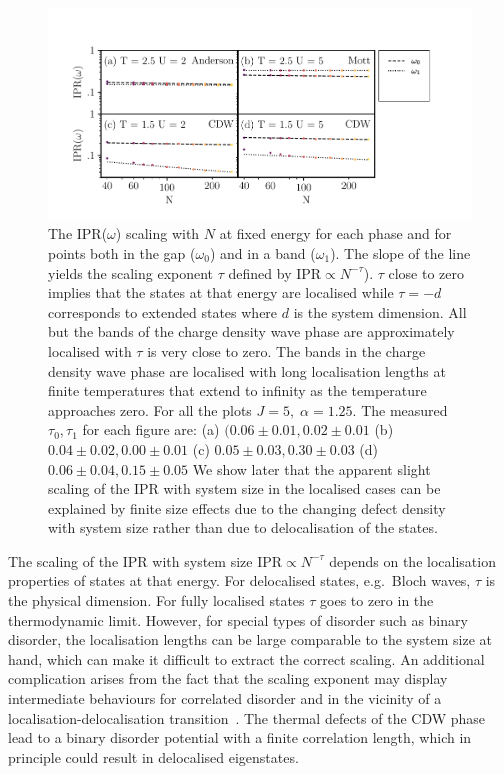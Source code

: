 \hypertarget{fig:IPR_scaling}{%
\begin{figure}
\centering
\includegraphics[width=1\textwidth,height=\textheight]{figure_code/fk_chapter/DOS/IPR_scaling}
\caption[{Scaling of IPR(\(\omega\)) against system size \(N\).}]{The IPR(\(\omega\)) scaling with \(N\) at fixed energy for each phase and for points both in the gap (\(\omega_0\)) and in a band (\(\omega_1\)). The slope of the line yields the scaling exponent \(\tau\) defined by \(\mathrm{IPR} \propto N^{-\tau}\)). \(\tau\) close to zero implies that the states at that energy are localised while \(\tau = -d\) corresponds to extended states where \(d\) is the system dimension. All but the bands of the charge density wave phase are approximately localised with \(\tau\) is very close to zero. The bands in the charge density wave phase are localised with long localisation lengths at finite temperatures that extend to infinity as the temperature approaches zero. For all the plots \(J = 5,\;\alpha = 1.25\). The measured \(\tau_0,\tau_1\) for each figure are: (a) \((0.06\pm0.01, 0.02\pm0.01\) (b) \(0.04\pm0.02, 0.00\pm0.01\) (c) \(0.05\pm0.03, 0.30\pm0.03\) (d) \(0.06\pm0.04, 0.15\pm0.05\) We show later that the apparent slight scaling of the IPR with system size in the localised cases can be explained by finite size effects due to the changing defect density with system size rather than due to delocalisation of the states.}
\label{fig:IPR_scaling}
\end{figure}
}

The scaling of the IPR with system size \(\mathrm{IPR} \propto N^{-\tau}\) depends on the localisation properties of states at that energy. For delocalised states, e.g.~Bloch waves, \(\tau\) is the physical dimension. For fully localised states \(\tau\) goes to zero in the thermodynamic limit. However, for special types of disorder such as binary disorder, the localisation lengths can be large comparable to the system size at hand, which can make it difficult to extract the correct scaling. An additional complication arises from the fact that the scaling exponent may display intermediate behaviours for correlated disorder and in the vicinity of a localisation-delocalisation transition~\autocite{kramerLocalizationTheoryExperiment1993,eversAndersonTransitions2008}. The thermal defects of the CDW phase lead to a binary disorder potential with a finite correlation length, which in principle could result in delocalised eigenstates.

